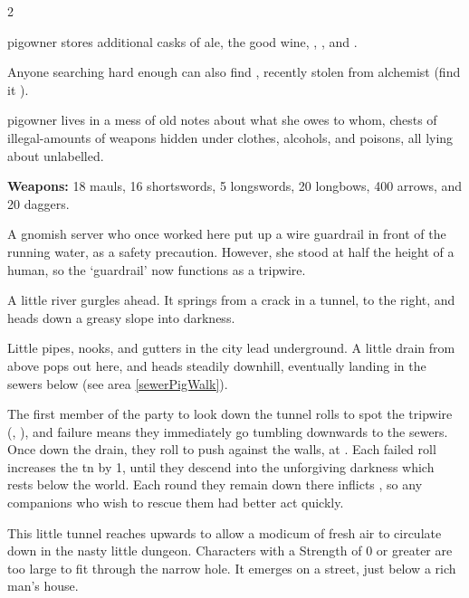 \begin{multicols}{2}


\Gls{pigowner} stores additional casks of ale, the good wine, \rations, \rations, and \rations.

Anyone searching hard enough can also find \lootTalisman,
recently stolen from \gls{alchemist}
(find it ).


\Gls{pigowner} lives in a mess of old notes about what she owes to whom, chests of illegal-amounts of \glspl{weapon}%
hidden under clothes, alcohols, and poisons, all lying about unlabelled.

\textbf{Weapons:} 18 mauls, 16 shortswords, 5 longswords, 20 longbows, 400 arrows, and 20 daggers.


\begin{exampletext}
  A gnomish \gls{server} who once worked here put up a wire guardrail in front of the running water, as a safety precaution.
  However, she stood at half the height of a human, so the `guardrail' now functions as a tripwire.
\end{exampletext}

\begin{boxtext}
  A little river gurgles ahead.
  It springs from a crack in a tunnel, to the right, and heads down a greasy slope into darkness.
\end{boxtext}

Little pipes, nooks, and gutters in the city lead underground.
A little drain from above pops out here, and heads steadily downhill, eventually landing in the sewers below (see area \vref{sewerPigWalk}).

The first member of the party to look down the tunnel rolls to spot the tripwire (, \tn[8]), and failure means they immediately go tumbling downwards to the sewers.
Once down the drain, they roll  to push against the walls, at \tn[9].
Each failed roll increases the \gls{tn} by 1, until they descend into the unforgiving darkness which rests below the world.
Each round they remain down there inflicts , so any companions who wish to rescue them had better act quickly.


This little tunnel reaches upwards to allow a modicum of fresh air to circulate down in the nasty little dungeon.
Characters with a Strength of 0 or greater are too large to fit through the narrow hole.
It emerges on a street, just below a rich man's house.


\end{multicols}
